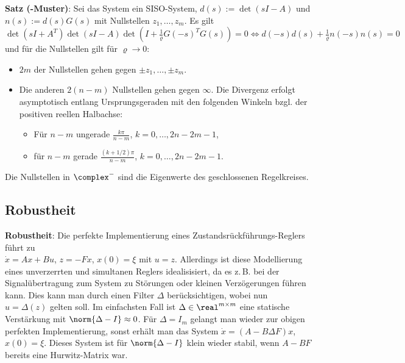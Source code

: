 \linie

\textbf{Satz (-Muster)}:
Sei das System ein SISO-System, $d(s) := \det(sI - A)$ und
$n(s) := d(s) G(s)$ mit Nullstellen $z_1, \dotsc, z_m$.
Es gilt\\
$\det(sI + A^T) \det(sI - A)
\det(I + \frac{1}{\varrho} G(-s)^T G(s)) = 0
\iff
d(-s) d(s) + \frac{1}{\varrho} n(-s) n(s) = 0$\\
und für die Nullstellen gilt für $\varrho \to 0$:
\begin{itemize}
    \item
    $2m$ der Nullstellen gehen gegen $\pm z_1, \dotsc, \pm z_m$.

    \item
    Die anderen $2(n - m)$ Nullstellen gehen gegen $\infty$.
    Die Divergenz erfolgt asymptotisch entlang Ursprungsgeraden mit den folgenden Winkeln
    bzgl. der positiven reellen Halbachse:
    \begin{itemize}
        \item
        Für $n - m$ ungerade
        $\frac{k\pi}{n - m}$, $k = 0, \dotsc, 2n - 2m - 1$,

        \item
        für $n - m$ gerade
        $\frac{(k + 1/2)\pi}{n - m}$, $k = 0, \dotsc, 2n - 2m - 1$.
    \end{itemize}
\end{itemize}
Die Nullstellen in $\complex^-$ sind die Eigenwerte des geschlossenen Regelkreises.

\pagebreak

\subsection{%
    Robustheit%
}

\textbf{Robustheit}:
Die perfekte Implementierung eines Zustandsrückführungs-Reglers führt zu\\
$\dot{x} = Ax + Bu$, $z = -Fx$, $x(0) = \xi$ mit $u = z$.
Allerdings ist diese Modellierung eines unverzerrten und simultanen Reglers
idealisisiert, da es z.\,B. bei der Signalübertragung zum
System zu Störungen oder kleinen Verzögerungen führen kann.
Dies kann man durch einen Filter $\Delta$ berücksichtigen, wobei nun $u = \Delta(z)$ gelten soll.
Im einfachsten Fall ist $\Delta \in \real^{m \times m}$ eine statische Verstärkung
mit $\norm{\Delta - I} \approx 0$.
Für $\Delta = I_m$ gelangt man wieder zur obigen perfekten Implementierung, sonst erhält man
das System $\dot{x} = (A - B\Delta F)x$, $x(0) = \xi$.
Dieses System ist für $\norm{\Delta - I}$ klein wieder stabil, wenn $A - BF$ bereits eine
Hurwitz-Matrix war.

